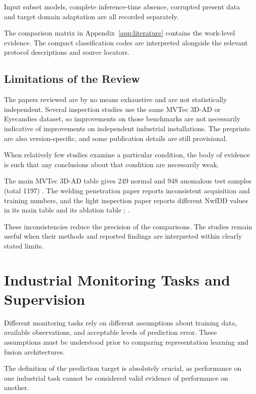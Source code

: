 Input subset models, complete inference-time absence, corrupted present data and target domain
adaptation are all recorded separately.

The comparison matrix in Appendix~\ref{app:literature} contains the work-level evidence. The compact
classification codes are interpreted alongside the relevant protocol descriptions and source
locators.

\subsection{Limitations of the Review}

The papers reviewed are by no means exhaustive and are not statistically independent. Several
inspection studies use the same MVTec 3D-AD or Eyecandies dataset, so improvements on those
benchmarks are not necessarily indicative of improvements on independent industrial installations.
The preprints are also version-specific, and some publication details are still provisional.

When relatively few studies examine a particular condition, the body of evidence is such that any
conclusions about that condition are necessarily weak.

The main MVTec 3D-AD table gives 249 normal and 948 anomalous test samples (total 1197)
\parencite[Table~1]{Bergmann2022The}. The welding penetration paper reports inconsistent acquisition and
training numbers, and the light inspection paper reports different NwfDD values in its main table
and its ablation table \parencite[pp.~6708, 6711]{Hua2026Weld}; \parencite[p.~6661, Tables~IV, VI--VII]{P035}.

These inconsistencies reduce the precision of the comparisons. The studies remain useful when their
methods and reported findings are interpreted within clearly stated limits.

\section{Industrial Monitoring Tasks and Supervision}

Different monitoring tasks rely on different assumptions about training data, available
observations, and acceptable levels of prediction error. These assumptions must be understood prior
to comparing representation learning and fusion architectures.

The definition of the prediction target is absolutely crucial, as performance on one industrial task
cannot be considered valid evidence of performance on another.

